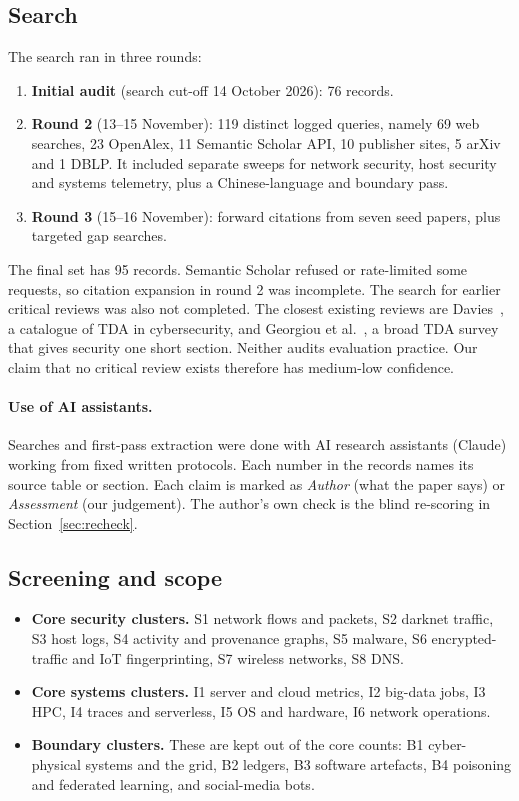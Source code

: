 \subsection{Search}
\label{sec:search}
The search ran in three rounds:
\begin{enumerate}
  \item \textbf{Initial audit} (search cut-off 14 October 2026): 76 records.
  \item \textbf{Round 2} (13--15 November): 119 distinct logged queries, namely 69 web searches, 23 OpenAlex, 11 Semantic Scholar API, 10 publisher sites, 5 arXiv and 1 DBLP. It included separate sweeps for network security, host security and systems telemetry, plus a Chinese-language and boundary pass.
  \item \textbf{Round 3} (15--16 November): forward citations from seven seed papers, plus targeted gap searches.
\end{enumerate}
The final set has 95 records. Semantic Scholar refused or rate-limited some requests, so citation expansion in round 2 was incomplete. The search for earlier critical reviews was also not completed. The closest existing reviews are Davies~\cite{P01}, a catalogue of TDA in cybersecurity, and Georgiou et al.~\cite{georgiou2026tda}, a broad TDA survey that gives security one short section. Neither audits evaluation practice. Our claim that no critical review exists therefore has medium-low confidence.

\paragraph{Use of AI assistants.} Searches and first-pass extraction were done with AI research assistants (Claude) working from fixed written protocols. Each number in the records names its source table or section. Each claim is marked as \emph{Author} (what the paper says) or \emph{Assessment} (our judgement). The author's own check is the blind re-scoring in Section~\ref{sec:recheck}. 

\subsection{Screening and scope}
\label{sec:scope}
\begin{itemize}
  \item \textbf{Core security clusters.} S1 network flows and packets, S2 darknet traffic, S3 host logs, S4 activity and provenance graphs, S5 malware, S6 encrypted-traffic and IoT fingerprinting, S7 wireless networks, S8 DNS.
  \item \textbf{Core systems clusters.} I1 server and cloud metrics, I2 big-data jobs, I3 HPC, I4 traces and serverless, I5 OS and hardware, I6 network operations.
  \item \textbf{Boundary clusters.} These are kept out of the core counts: B1 cyber-physical systems and the grid, B2 ledgers, B3 software artefacts, B4 poisoning and federated learning, and social-media bots.
\end{itemize}

